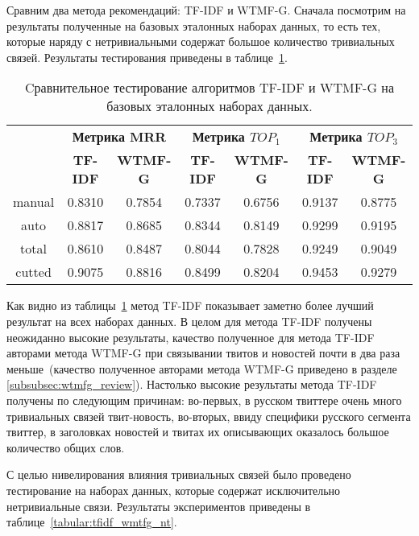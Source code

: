     Сравним два метода рекомендаций: TF-IDF и WTMF-G. Сначала посмотрим на результаты полученные на 
    базовых эталонных наборах данных, то есть тех, которые наряду с нетривиальными содержат большое количество тривиальных связей.
    Результаты тестирования приведены в таблице~\ref{tabular:tfidf_wmtfg}.

    \begin{table}[ht!]
    \caption{Cравнительное тестирование алгоритмов TF-IDF и WTMF-G на базовых эталонных наборах данных. \bigskip}
    \centering

    \label{tabular:tfidf_wmtfg}
        \begin{tabular}{|c|c|c|c|c|c|c|}
            \hline
            \bf{\multirow{2}{*}{\specialcell{Набор данных}}} &
            \multicolumn{2}{|c|}{\bf{Метрика MRR}} &
            \multicolumn{2}{|c|}{\bf{Метрика $TOP_1$}} &
            \multicolumn{2}{|c|}{\bf{Метрика $TOP_3$}} \\ \cline{2-7}
            & \bf{TF-IDF} & \bf{WTMF-G} & \bf{TF-IDF} & \bf{WTMF-G} & \bf{TF-IDF} & \bf{WTMF-G} \\ \hline
            manual & 0.8310 & 0.7854 & 0.7337 & 0.6756 & 0.9137 & 0.8775 \\ \hline
            auto   & 0.8817 & 0.8685 & 0.8344 & 0.8149 & 0.9299 & 0.9195 \\ \hline
            total  & 0.8610 & 0.8487 & 0.8044 & 0.7828 & 0.9249 & 0.9049 \\ \hline
            cutted & 0.9075 & 0.8816 & 0.8499 & 0.8204 & 0.9453 & 0.9279 \\ \hline
        \end{tabular}
    \end{table}

    Как видно из таблицы~\ref{tabular:tfidf_wmtfg} метод TF-IDF показывает заметно более лучший результат на всех наборах данных.
    В целом для метода TF-IDF получены неожиданно высокие результаты, качество полученное для метода TF-IDF авторами метода WTMF-G при связывании твитов и новостей почти в два раза меньше~(качество полученное авторами метода WTMF-G приведено в разделе \ref{subsubsec:wtmfg_review}).
    Настолько высокие результаты метода TF-IDF получены по следующим причинам: во-первых, в русском твиттере очень много тривиальных связей твит-новость,
    во-вторых, ввиду специфики русского сегмента твиттер, в заголовках новостей и твитах их описывающих оказалось большое количество общих слов.

    С целью нивелирования влияния тривиальных связей было проведено тестирование на наборах данных, которые содержат исключительно нетривиальные связи.
    Результаты экспериментов приведены в таблице~\ref{tabular:tfidf_wmtfg_nt}.

